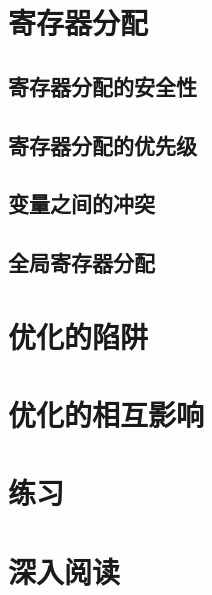 \documentclass[cn,11pt,chinese]{elegantbook}
\begin{document}
\section{寄存器分配}

\subsection{寄存器分配的安全性}

\subsection{寄存器分配的优先级}

\subsection{变量之间的冲突}

\subsection{全局寄存器分配}

\section{优化的陷阱}

\section{优化的相互影响}

\section{练习}

\section{深入阅读}
\end{document}
